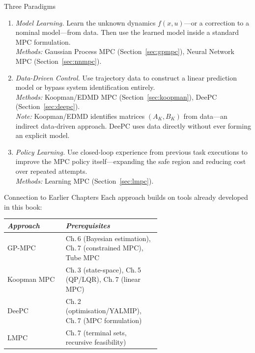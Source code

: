 \begin{defnbox}{Three Paradigms}
	\begin{enumerate}
		\item \emph{Model Learning.} Learn the unknown dynamics $f(x,u)$---or a correction to a nominal model---from data. Then use the learned model inside a standard MPC formulation.\\
		\emph{Methods:} Gaussian Process MPC (Section~\ref{sec:gpmpc}), Neural Network MPC (Section~\ref{sec:nnmpc}).

		\item \emph{Data-Driven Control.} Use trajectory data to construct a linear prediction model or bypass system identification entirely.\\
		\emph{Methods:} Koopman/EDMD MPC (Section~\ref{sec:koopman}), DeePC (Section~\ref{sec:deepc}).\\
		\emph{Note:} Koopman/EDMD identifies matrices $(A_K, B_K)$ from data---an indirect data-driven approach. DeePC uses data directly without ever forming an explicit model.

		\item \emph{Policy Learning.} Use closed-loop experience from previous task executions to improve the MPC policy itself---expanding the safe region and reducing cost over repeated attempts.\\
		\emph{Methods:} Learning MPC (Section~\ref{sec:lmpc}).
	\end{enumerate}
\end{defnbox}

\begin{notebox}{Connection to Earlier Chapters}
	Each approach builds on tools already developed in this book:
	\begin{center}
		\small
		\begin{tabular}{@{}l p{0.62\linewidth}@{}}
			\toprule
			\emph{Approach} & \emph{Prerequisites} \\
			\midrule
			GP-MPC & Ch.\,6 (Bayesian estimation), Ch.\,7 (constrained MPC), Tube MPC \\
			Koopman MPC & Ch.\,3 (state-space), Ch.\,5 (QP/LQR), Ch.\,7 (linear MPC) \\
			DeePC & Ch.\,2 (optimisation/YALMIP), Ch.\,7 (MPC formulation) \\
			LMPC & Ch.\,7 (terminal sets, recursive feasibility) \\
			\bottomrule
		\end{tabular}
	\end{center}
\end{notebox}

